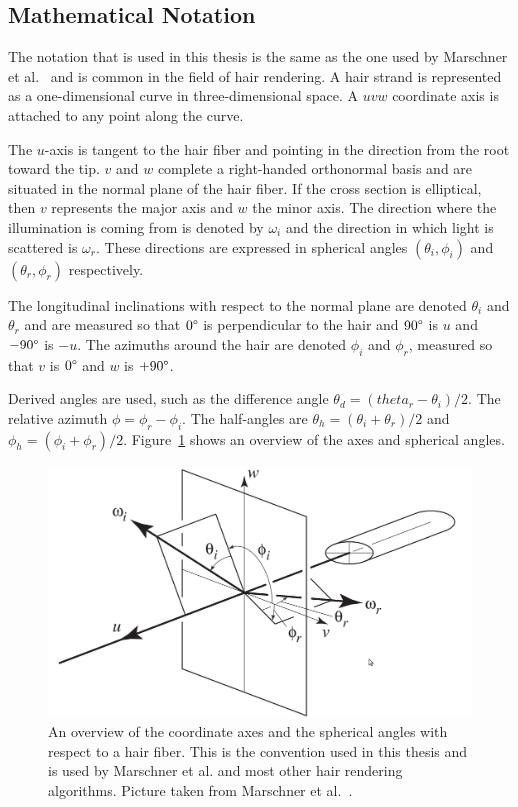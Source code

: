 \documentclass[11pt,a4paper]{report}
\begin{document}
\subsection{Mathematical Notation}

The notation that is used in this thesis is the same as the one used by Marschner et al.~\cite{marschner} and is common in the field of hair rendering. A hair strand is represented as a one-dimensional curve in three-dimensional space. A $uvw$ coordinate axis is attached to any point along the curve.

The $u$-axis is tangent to the hair fiber and pointing in the direction from the root toward the tip. $v$ and $w$ complete a right-handed orthonormal basis and are situated in the normal plane of the hair fiber. If the cross section is elliptical, then  $v$ represents the major axis and $w$ the minor axis. The direction where the illumination is coming from is denoted by $\omega_i$ and the direction in which light is scattered is $\omega_r$. These directions are expressed in spherical angles $(\theta_i, \phi_i)$ and $(\theta_r,\phi_r)$ respectively.

The longitudinal inclinations with respect to the normal plane are denoted $\theta_i$ and $\theta_r$ and are measured so that $0\degree$ is perpendicular to the hair and $90\degree$ is $u$ and $-90\degree$ is $-u$. The azimuths around the hair are denoted $\phi_i$ and $\phi_r$, measured so that $v$ is $0\degree$ and $w$ is $+90\degree$.

Derived angles are used, such as the difference angle $\theta_d = (theta_r - \theta_i)/2$. The relative azimuth $\phi = \phi_r - \phi_i$. The half-angles are $\theta_h = (\theta_i + \theta_r)/2$ and $\phi_h = (\phi_i + \phi_r)/2$. Figure~\ref{axis_overview} shows an overview of the axes and spherical angles.

\begin{center}
\begin{figure}

\includegraphics[scale=.4]{images/axes.jpeg}

\caption{An overview of the coordinate axes and the spherical angles with respect to a hair fiber. This is the convention used in this thesis and is used by Marschner et al. and most other hair rendering algorithms. Picture taken from Marschner et al.~\cite{marschner}.}
\label{axis_overview}

\end{figure}
\end{center}
\end{document}
